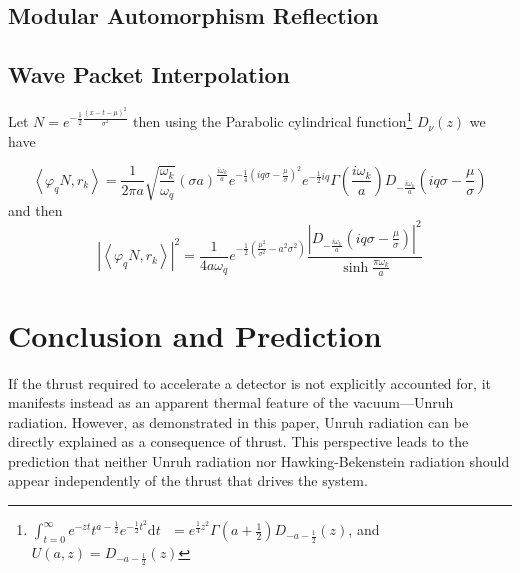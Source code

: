 \documentclass[12pt,a4paper]{article}
\newcommand{\dv}[1]{\mathrm{d} #1 \text{ }}
\begin{document}
\subsection{Modular Automorphism \textemdash{} Reflection}



\subsection{Wave Packet Interpolation}
Let $N = e^{-\frac{1}{2} \frac{(x-t-\mu)^2}{\sigma^2}}$ then using the Parabolic cylindrical function\footnote{$\int_{t=0}^\infty e^{-zt} t^{a-\frac{1}{2}} e^{-\frac{1}{2} t^2} \dv{t} = e^{\frac{1}{4}z^2} \Gamma\left(a + \frac{1}{2}\right) D_{-a - \frac{1}{2}}\left(z\right)$, and $U(a,z) = D_{-a - \frac{1}{2}}\left(z\right)$} $D_\nu(z)$ we have

\begin{equation}
  \left< \varphi_q N, r_k \right> = \frac{1}{2\pi a} \sqrt{\frac{\omega_k}{\omega_q}} (\sigma a)^\frac{i\omega_k}{a} e^{-\frac{1}{4}\left(i q \sigma - \frac{\mu}{\sigma}\right)^2} e^{-\frac{1}{2} i q} \Gamma\left(\frac{i \omega_k}{a}\right) D_{-\frac{i\omega_k}{a}}\left(iq\sigma - \frac{\mu}{\sigma}\right)
\end{equation}
and then
\begin{equation}
  \left|\left< \varphi_q N, r_k \right>\right|^2 = \frac{1}{4a\omega_q} e^{-\frac{1}{2} \left(\frac{\mu^2}{\sigma^2} - a^2 \sigma^2\right)} \frac{\left| D_{-\frac{i\omega_k}{a}}\left(iq\sigma - \frac{\mu}{\sigma}\right) \right|^2}{\sinh \frac{\pi \omega_k}{a}}
\end{equation}

\section{Conclusion and Prediction}
If the thrust required to accelerate a detector is not explicitly accounted for, it manifests instead as an apparent thermal feature of the vacuum—Unruh radiation. However, as demonstrated in this paper, Unruh radiation can be directly explained as a consequence of thrust. This perspective leads to the prediction that neither Unruh radiation nor Hawking-Bekenstein radiation should appear independently of the thrust that drives the system.
\end{document}
